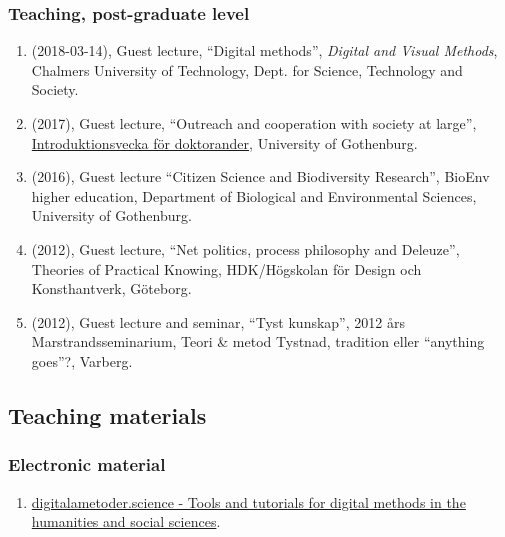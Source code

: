 \documentclass[
]{article}
\providecommand{\tightlist}{%
  \setlength{\itemsep}{0pt}\setlength{\parskip}{0pt}}
\begin{document}
\hypertarget{teaching-post-graduate-level}{%
\subsubsection{Teaching, post-graduate
level}\label{teaching-post-graduate-level}}

\begin{enumerate}
\def\labelenumi{\arabic{enumi}.}
\tightlist
\item
  (2018-03-14), Guest lecture, ``Digital methods'', \emph{Digital and
  Visual Methods}, Chalmers University of Technology, Dept. for Science,
  Technology and Society.
\item
  (2017), Guest lecture, ``Outreach and cooperation with society at
  large'',
  \href{http://hum.gu.se/utbildning/forskarniva/introduktionsvecka-for-doktorander-2017}{Introduktionsvecka
  för doktorander}, University of Gothenburg.
\item
  (2016), Guest lecture ``Citizen Science and Biodiversity Research'',
  BioEnv higher education, Department of Biological and Environmental
  Sciences, University of Gothenburg.
\item
  (2012), Guest lecture, ``Net politics, process philosophy and
  Deleuze'', Theories of Practical Knowing, HDK/Högskolan för Design och
  Konsthantverk, Göteborg.
\item
  (2012), Guest lecture and seminar, ``Tyst kunskap'', 2012 års
  Marstrandsseminarium, Teori \& metod Tystnad, tradition eller
  ``anything goes''?, Varberg.
\end{enumerate}

\hypertarget{teaching-materials}{%
\subsection{Teaching materials}\label{teaching-materials}}

\hypertarget{electronic-material}{%
\subsubsection{Electronic material}\label{electronic-material}}

\begin{enumerate}
\def\labelenumi{\arabic{enumi}.}
\tightlist
\item
  \href{http://digitalametoder.science}{digitalametoder.science - Tools
  and tutorials for digital methods in the humanities and social
  sciences}.
\end{enumerate}
\end{document}
